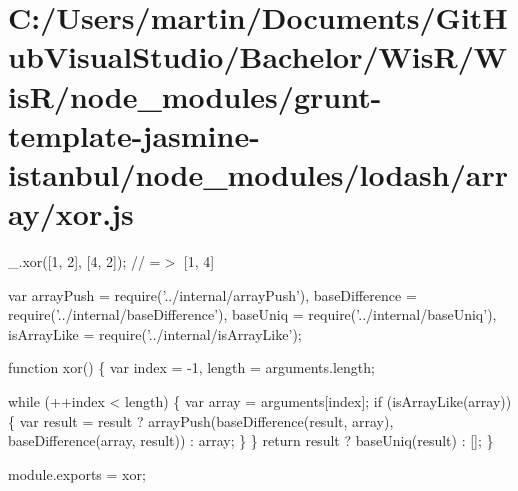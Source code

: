 \hypertarget{_c_1_2_users_2martin_2_documents_2_git_hub_visual_studio_2_bachelor_2_wis_r_2_wis_r_2node_module4fd1ddd143bee8aa509d850492959df0}{}\section{C\+:/\+Users/martin/\+Documents/\+Git\+Hub\+Visual\+Studio/\+Bachelor/\+Wis\+R/\+Wis\+R/node\+\_\+modules/grunt-\/template-\/jasmine-\/istanbul/node\+\_\+modules/lodash/array/xor.\+js}
\+\_\+.\+xor(\mbox{[}1, 2\mbox{]}, \mbox{[}4, 2\mbox{]}); // =$>$ \mbox{[}1, 4\mbox{]}


\begin{DoxyCodeInclude}
var arrayPush = require(\textcolor{stringliteral}{'../internal/arrayPush'}),
    baseDifference = require(\textcolor{stringliteral}{'../internal/baseDifference'}),
    baseUniq = require(\textcolor{stringliteral}{'../internal/baseUniq'}),
    isArrayLike = require(\textcolor{stringliteral}{'../internal/isArrayLike'});

\textcolor{keyword}{function} xor() \{
  var index = -1,
      length = arguments.length;

  \textcolor{keywordflow}{while} (++index < length) \{
    var array = arguments[index];
    \textcolor{keywordflow}{if} (isArrayLike(array)) \{
      var result = result
        ? arrayPush(baseDifference(result, array), baseDifference(array, result))
        : array;
    \}
  \}
  \textcolor{keywordflow}{return} result ? baseUniq(result) : [];
\}

module.exports = xor;
\end{DoxyCodeInclude}
 